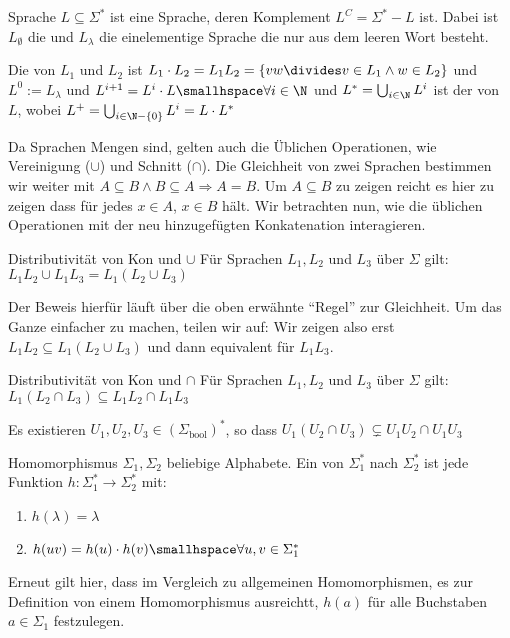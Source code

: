 \begin{definition}[]{Sprache}
    $L \subseteq \Sigma^*$ ist eine Sprache, deren Komplement $L^C = \Sigma^* - L$ ist. 
    Dabei ist $L_{\emptyset}$ die  und $L_{\lambda}$ die einelementige Sprache die nur aus dem leeren Wort besteht.

    Die  von $L_1$ und $L_2$ ist $L_1 \cdot L_2 = L_1 L_2 = \{ vw \divides v \in L_1 \land w \in L_2 \}$ und $L^0 := L_{\lambda}$ und $L^{i + 1} = L^i \cdot L \smallhspace \forall i \in \N$ und $L^* = \bigcup_{i \in \N} L^{i}$ ist der  von $L$, wobei $L^+ = \bigcup_{i \in \N - \{0\}} L^i = L \cdot L^*$
\end{definition}

Da Sprachen Mengen sind, gelten auch die Üblichen Operationen, wie Vereinigung ($\cup$) und Schnitt ($\cap$).
Die Gleichheit von zwei Sprachen bestimmen wir weiter mit $A \subseteq B \land B \subseteq A \Rightarrow A = B$.
Um $A \subseteq B$ zu zeigen reicht es hier zu zeigen dass für jedes $x \in A$, $x \in B$ hält.
Wir betrachten nun, wie die üblichen Operationen mit der neu hinzugefügten Konkatenation interagieren.

\begin{lemma}[]{Distributivität von Kon und $\cup$}
    Für Sprachen $L_1, L_2$ und $L_3$ über $\Sigma$ gilt: $L_1 L_2 \cup L_1 L_3 = L_1 (L_2 \cup L_3)$
\end{lemma}

Der Beweis hierfür läuft über die oben erwähnte ``Regel'' zur Gleichheit. 
Um das Ganze einfacher zu machen, teilen wir auf: Wir zeigen also erst $L_1 L_2 \subseteq L_1(L_2 \cup L_3)$ und dann equivalent für $L_1 L_3$.


\begin{lemma}[]{Distributivität von Kon und $\cap$}
    Für Sprachen $L_1, L_2$ und $L_3$ über $\Sigma$ gilt: $L_1 (L_2 \cap L_3) \subseteq L_1 L_2 \cap L_1 L_3$
\end{lemma}

\shortlemma Es existieren $U_1, U_2, U_3 \in (\Sigma_{\text{bool}})^*$, so dass $U_1 (U_2 \cap U_3) \subsetneq U_1 U_2 \cap U_1 U_3$



\begin{definition}[]{Homomorphismus}
    $\Sigma_1, \Sigma_2$ beliebige Alphabete. Ein  von $\Sigma^*_1$ nach $\Sigma^*_2$ ist jede Funktion $h: \Sigma_1^* \rightarrow \Sigma_2^*$ mit:
    \begin{enumerate}[label=\textit{(\roman*)}]
        \item $h(\lambda) = \lambda$
        \item $h(uv) = h(u) \cdot h(v) \smallhspace \forall u, v \in \Sigma_1^*$
    \end{enumerate}
\end{definition}

Erneut gilt hier, dass im Vergleich zu allgemeinen Homomorphismen, es zur Definition von einem Homomorphismus ausreichtt, $h(a)$ für alle Buchstaben $a \in \Sigma_1$ festzulegen.

